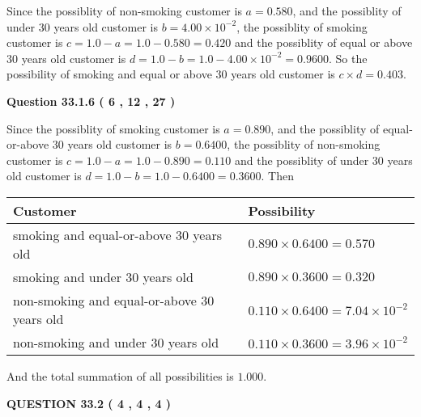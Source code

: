 \documentclass[12pt]{article}
\begin{document}
  
 
 

Since the possiblity of  %
 non-smoking customer is $ a =  %
0.580 $,
and the possiblity of  %
 under 30 years old customer is $ b =  %
4.00 \times 10^{-2} $,
the possiblity of  %
smoking customer is $ c = 1.0 - a = 1.0 -
0.580
=  %
0.420 $ and the possiblity of  %
equal or above 30 years old
customer is $ d = 1.0 - b = 1.0 -  %
4.00 \times 10^{-2} =  %
0.9600  $.
So the possibility of  %
smoking and  %
equal or above 30 years old
customer is $ c \times d =  %
0.403 $.
 
 
 
  
\vspace{0.2in}
  
{\textbf{\Large{Question
33.1.6 
 (           6 ,          12 ,          27 )
}}}
  
  
 
 

Since the possiblity of  %
smoking customer is $ a =  %
0.890 $,
and the possiblity of  %
equal-or-above 30 years old customer is $ b =  %
0.6400 $,
the possiblity of  %
non-smoking customer is $ c = 1.0 - a = 1.0 -
0.890
=  %
0.110 $ and the possiblity of  %
under 30 years old
customer is $ d = 1.0 - b = 1.0 -  %
0.6400 =  %
0.3600  $.
Then
 
\noindent
\begin{tabular}{|l|l|}
\hline
Customer & Possibility \\
\hline
smoking  and  %
equal-or-above 30 years old  &
  $ %
0.890 \times  %
0.6400 =  %
0.570$ \\
\hline
smoking  and  %
under 30 years old &
  $ %
0.890 \times  %
0.3600 =  %
0.320$ \\
\hline
 non-smoking and  %
equal-or-above 30 years old  &
  $ %
0.110 \times  %
0.6400 =  %
7.04 \times 10^{-2}$ \\
\hline
 non-smoking and  %
under 30 years old &
  $ %
0.110 \times  %
0.3600 =  %
3.96 \times 10^{-2}$ \\
\hline
\end{tabular}
 
\noindent
And the total summation of all possibilities is $  %
1.000 $.
 
 
 
 
  
\vspace{0.2in}
  
{\textbf{\Large{QUESTION
33.2 
 (           4 ,           4 ,           4 )
}}}
  
\end{document}
